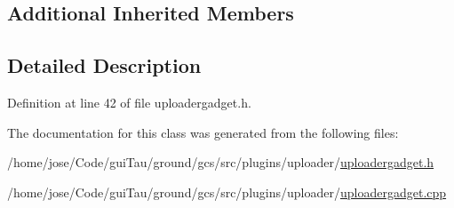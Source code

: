 \subsection*{Additional Inherited Members}


\subsection{Detailed Description}


Definition at line 42 of file uploadergadget.\-h.



The documentation for this class was generated from the following files\-:\begin{DoxyCompactItemize}
\item 
/home/jose/\-Code/gui\-Tau/ground/gcs/src/plugins/uploader/\hyperlink{uploadergadget_8h}{uploadergadget.\-h}\item 
/home/jose/\-Code/gui\-Tau/ground/gcs/src/plugins/uploader/\hyperlink{uploadergadget_8cpp}{uploadergadget.\-cpp}\end{DoxyCompactItemize}

